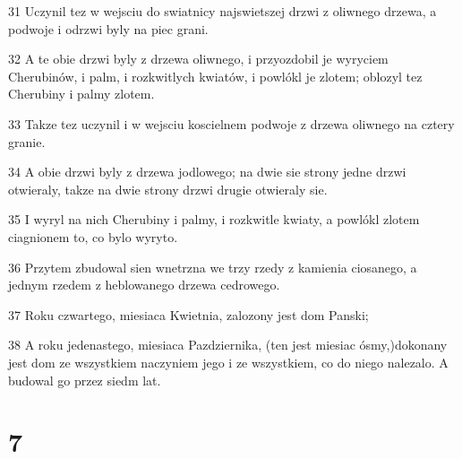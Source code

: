 \par 31 Uczynil tez w wejsciu do swiatnicy najswietszej drzwi z oliwnego drzewa, a podwoje i odrzwi byly na piec grani.
\par 32 A te obie drzwi byly z drzewa oliwnego, i przyozdobil je wyryciem Cherubinów, i palm, i rozkwitlych kwiatów, i powlókl je zlotem; oblozyl tez Cherubiny i palmy zlotem.
\par 33 Takze tez uczynil i w wejsciu koscielnem podwoje z drzewa oliwnego na cztery granie.
\par 34 A obie drzwi byly z drzewa jodlowego; na dwie sie strony jedne drzwi otwieraly, takze na dwie strony drzwi drugie otwieraly sie.
\par 35 I wyryl na nich Cherubiny i palmy, i rozkwitle kwiaty, a powlókl zlotem ciagnionem to, co bylo wyryto.
\par 36 Przytem zbudowal sien wnetrzna we trzy rzedy z kamienia ciosanego, a jednym rzedem z heblowanego drzewa cedrowego.
\par 37 Roku czwartego, miesiaca Kwietnia, zalozony jest dom Panski;
\par 38 A roku jedenastego, miesiaca Pazdziernika, (ten jest miesiac ósmy,)dokonany jest dom ze wszystkiem naczyniem jego i ze wszystkiem, co do niego nalezalo. A budowal go przez siedm lat.

\chapter{7}

